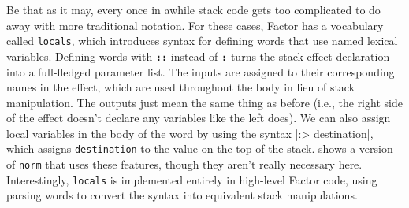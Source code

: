 
Be that as it may, every once in awhile stack code gets too complicated to do
away with more traditional notation.  For these cases, Factor has a vocabulary
called \Verb|locals|, which introduces syntax for defining words that use named
lexical variables.  Defining words with \texttt{\textbf{::}} instead of
\texttt{\textbf{:}} turns the stack effect declaration into a full-fledged
parameter list.  The inputs are assigned to their corresponding names in the
effect, which are used throughout the body in lieu of stack manipulation.  The
outputs just mean the same thing as before (i.e., the right side of the effect
doesn't declare any variables like the left does).  We can also assign local
variables in the body of the word by using the syntax
%
\factor|:> destination|,
%
which assigns \Verb|destination| to the value on the top of the stack.
 shows a version of \Verb|norm| that uses these features,
though they aren't really necessary here.  Interestingly, \Verb|locals| is
implemented entirely in high-level Factor code, using parsing words to convert
the syntax into equivalent stack manipulations.

